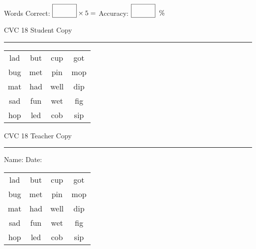 \documentclass{memoir}
\begin{document}
\normalsize

Words Correct: $\fbox{\phantom{\huge 100}} \times 5 = $ Accuracy: $\fbox{\phantom{\huge 100}}\;\; \%$ 

\vfill

\newpage


\footnotesize \noindent
CVC 18 \hfill Student Copy
\smallskip
\hrule

\huge

\setlength{\tabcolsep}{14pt}
\def\arraystretch{2}

{\selectfont


\begin{vplace}[0.5]
\begin{center}
\begin{tabular}{cccc}
lad & but & cup & got \\
bug & met & pin & mop \\
mat & had & well & dip \\
sad & fun & wet & fig \\
hop & led & cob & sip \\
\end{tabular}
\end{center}
\end{vplace}

}

\newpage

\footnotesize \noindent
CVC 18 \hfill Teacher Copy
\smallskip
\hrule

\normalsize

\vfill

\noindent
Name: \underline{\hspace{1.75in}} \hfill Date: \underline{\hspace{1in}}

\huge

{\selectfont


\begin{vplace}[0.5]
\begin{center}
\begin{tabular}{cccc}
lad & but & cup & got \\
bug & met & pin & mop \\
mat & had & well & dip \\
sad & fun & wet & fig \\
hop & led & cob & sip \\
\end{tabular}
\end{center}
\end{vplace}



}
\end{document}
